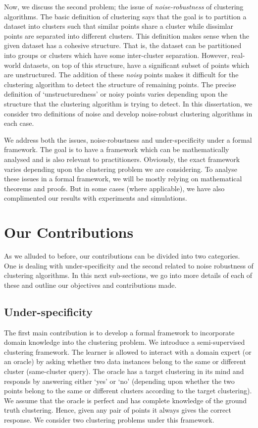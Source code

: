 \documentclass[12pt]{article}
\begin{document}
Now, we discuss the second problem; the issue of \textit{noise-robustness} of clustering algorithms. The basic definition of clustering says that the goal is to partition a dataset into clusters such that similar points share a cluster while dissimlar points are separated into different clusters. This definition makes sense when the given dataset has a cohesive structure. That is, the dataset can be partitioned into groups or clusters which have some inter-cluster separation. However, real-world datasets, on top of this structure, have a significant subset of points which are unstructured. The addition of these \textit{noisy} points makes it difficult for the clustering algorithm to detect the structure of remaining points. The precise definition of `unstructuredness' or noisy points varies depending upon the structure that the clustering algorithm is trying to detect. In this dissertation, we consider two definitions of noise and develop noise-robust clustering algorithms in each case.

We address both the issues, noise-robustness and under-specificity under a formal framework. The goal is to have a framework which can be mathematically analysed and is also relevant to practitioners. Obviously, the exact framework varies depending upon the clustering problem we are considering. To analyse these issues in a formal framework, we will be mostly relying on mathematical theorems and proofs. But in some cases (where applicable), we have also complimented our results with experiments and simulations. 

\section{Our Contributions} 
As we alluded to before, our contributions can be divided into two categories. One is dealing with under-specificity and the second related to noise robustness of clustering algorithms. In this next sub-sections, we go into more details of each of these and outline our  objectives and contributions made. 

\subsection{Under-specificity}
The first main contribution is to develop a formal framework to incorporate domain knowledge into the clustering problem. We introduce a semi-supervised clustering framework. The learner is allowed to interact with a domain expert (or an oracle) by asking whether two data instances belong to the same  or different cluster (same-cluster query). The oracle has a target clustering in its mind and responds by answering either `yes' or `no' (depending upon whether the two points belong to the same or different clusters according to the target clustering). We assume that the oracle is perfect and has complete knowledge of the ground truth clustering. Hence, given any pair of points it always gives the correct response. We consider two clustering problems under this framework.
\end{document}
